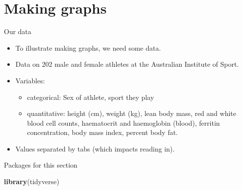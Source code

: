 \documentclass[
  ignorenonframetext,
]{beamer}
\newenvironment{Shaded}{\begin{snugshade}}{\end{snugshade}}
\newcommand{\KeywordTok}[1]{\textcolor[rgb]{0.13,0.29,0.53}{\textbf{#1}}}
\newcommand{\NormalTok}[1]{#1}
\providecommand{\tightlist}{%
  \setlength{\itemsep}{0pt}\setlength{\parskip}{0pt}}
\begin{document}
\hypertarget{making-graphs}{%
\section{Making graphs}\label{making-graphs}}

\begin{frame}{Our data}
\protect\hypertarget{our-data}{}

\begin{itemize}
\tightlist
\item
  To illustrate making graphs, we need some data.
\item
  Data on 202 male and female athletes at the Australian Institute of
  Sport.
\item
  Variables:

  \begin{itemize}
  \tightlist
  \item
    categorical: Sex of athlete, sport they play
  \item
    quantitative: height (cm), weight (kg), lean body mass, red and
    white blood cell counts, haematocrit and haemoglobin (blood),
    ferritin concentration, body mass index, percent body fat.
  \end{itemize}
\item
  Values separated by tabs (which impacts reading in).
\end{itemize}

\end{frame}

\begin{frame}[fragile]{Packages for this section}
\protect\hypertarget{packages-for-this-section-1}{}

\begin{Shaded}
\begin{Highlighting}[]
\KeywordTok{library}\NormalTok{(tidyverse)}
\end{Highlighting}
\end{Shaded}

\end{frame}
\end{document}
